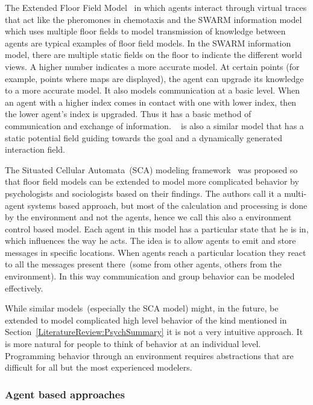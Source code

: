 The Extended Floor Field Model~\cite{nishinari2004extended} in which agents interact through virtual traces that act like the pheromones in chemotaxis and the SWARM information model~\cite{Henein:2006jq} which uses multiple floor fields to model transmission of knowledge between agents are typical examples of floor field models. In the SWARM information model, there are multiple static fields on the floor to indicate the different world views. A higher number indicates a more accurate model. At certain points (for example, points where maps are displayed), the agent can upgrade its knowledge to a more accurate model. It also models communication at a basic level. When an agent with a higher index comes in contact with one with lower index, then the lower agent's index is upgraded. Thus it has a basic method of communication and exchange of information. ~\cite{Qi:2011kv} is also a similar model that has a static potential field guiding towards the goal and a dynamically generated interaction field.

The Situated Cellular Automata~(SCA) modeling framework~\cite{Bandini:2007fa} was proposed so that floor field models can be extended to model more complicated behavior by psychologists and sociologists based on their findings. The authors call it a multi-agent systems based approach, but most of the calculation and processing is done by the environment and not the agents, hence we call this also a environment control based model. Each agent in this model has a particular state that he is in, which influences the way he acts. The idea is to allow agents to emit and store messages in specific locations. When agents reach a particular location they react to all the messages present there~(some from other agents, others from the environment). In this way communication and group behavior can be modeled effectively.

While similar models~(especially the SCA model) might, in the future, be extended to model complicated high level behavior of the kind mentioned in Section~\ref{LiteratureReview:PsychSummary} it is not a very intuitive approach. It is more natural for people to think of behavior at an individual level. Programming behavior through an environment requires abstractions that are difficult for all but the most experienced modelers.

\subsubsection{Agent based approaches}


